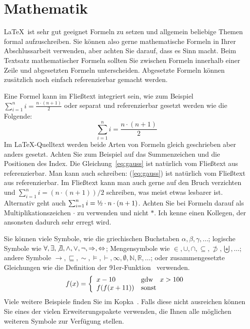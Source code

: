 \documentclass[11pt,a4paper]{report}
\begin{document}
\section{Mathematik} \label{sec:mathematik}

\LaTeX\ ist sehr gut geeignet Formeln zu setzen und 
allgemein beliebige Themen formal aufzuschreiben.
Sie können also gerne mathematische Formeln in Ihrer 
Abschlussarbeit verwenden, aber achten Sie darauf, dass
es Sinn macht. 
Beim Textsatz mathematischer Formeln sollten Sie zwischen 
Formeln innerhalb einer Zeile und abgesetzten Formeln unterscheiden. 
Abgesetzte Formeln können zusätzlich noch einfach referenzierbar
gemacht werden.

Eine Formel kann im Fließtext integriert sein, wie zum Beispiel 
$\sum_{i=1}^n i = \frac{n \cdot (n+1)}{2}$ oder separat
und referenzierbar gesetzt werden wie die Folgende:
\begin{equation} \label{eq:gauss}
  \sum_{i=1}^n i = \frac{n \cdot (n+1)}{2}
\end{equation}
Im \LaTeX-Quelltext werden beide Arten von Formeln gleich geschrieben 
aber anders gesetzt. 
Achten Sie zum Beispiel auf das Summenzeichen und die Positionen 
des Index. 
Die Gleichung~\ref{eq:gauss} ist natürlich vom Fließtext aus referenzierbar.
Man kann auch schreiben: 
(\ref{eq:gauss}) ist natürlich vom Fließtext aus referenzierbar.
Im Fließtext kann man auch gerne auf den Bruch verzichten und 
$\sum_{i=1}^n i = (n \cdot (n+1))/2$
schreiben, was meist etwas lesbarer ist.
Alternativ geht auch 
$\sum_{i=1}^n i = \mbox{\textonehalf} \cdot n \cdot (n+1)$.
Achten Sie bei Formeln darauf als Multiplikationszeichen 
$\cdot$ zu verwenden und nicht $*$. 
Ich kenne einen Kollegen, der ansonsten dadurch sehr erregt wird. 

Sie können viele Symbole, wie die griechischen Buchstaben 
$\alpha, \beta, \gamma, \ldots$;
logische Symbole wie $\forall, \exists, \not\exists, \wedge, \vee, \neg,
\Rightarrow, \Leftrightarrow$;
Mengensymbole wie $\in, \cup, \cap, \subseteq, \not\supset, 
\biguplus, \ldots$;
andere Symbole $\rightarrow, \sqsubseteq, \sim, 
\models, \vdash, \infty, \emptyset, \mathbb{N}, \mathbb{R}, \ldots$;
oder zusammengesetzte Gleichungen 
wie die Definition der 91er-Funktion~\cite{manna70}
verwenden.
\[
  f(x) = \left\{ \begin{array}{lll}
      x-10 & \mbox{gdw} & x>100 \\
      f(f(x+11)) & \multicolumn{2}{l}{\mbox{sonst}} 
    \end{array} \right.
\]
Viele weitere Beispiele finden Sie im Kopka~\cite{kopka}.
Falls diese nicht ausreichen können Sie eines der vielen
Erweiterungspakete verwenden, die Ihnen alle möglichen 
weiteren Symbole zur Verfügung stellen.
\end{document}
